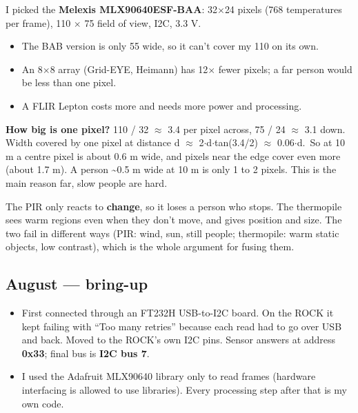 \documentclass[11pt,a4paper]{article}
\providecommand{\tightlist}{\setlength{\itemsep}{0pt}\setlength{\parskip}{0pt}}
\begin{document}
I picked the \textbf{Melexis
MLX90640ESF-BAA}: 32$\times$24 pixels
(768 temperatures per frame),
110\textdegree{} $\times$ 75\textdegree{} field of view, I2C,
3.3 V.

\begin{itemize}
\tightlist
\item
  The BAB version is only 55\textdegree{}
  wide, so it can't cover my
  110\textdegree{} on its own.
\item
  An 8$\times$8 array (Grid-EYE,
  Heimann) has 12$\times$ fewer
  pixels; a far person would
  be less than one pixel.
\item
  A FLIR Lepton costs more and
  needs more power and
  processing.
\end{itemize}

\textbf{How big is one pixel?}
110\textdegree{} / 32 $\approx$ 3.4\textdegree{} per pixel
across, 75\textdegree{} / 24 $\approx$ 3.1\textdegree{} down.
Width covered by one pixel at
distance d $\approx$ 2$\cdot$d$\cdot$tan(3.4\textdegree{}/2) $\approx$
0.06$\cdot$d.~So at 10 m a centre
pixel is about 0.6 m wide, and
pixels near the edge cover
even more (about 1.7 m). A
person \textasciitilde0.5 m
wide at 10 m is only 1 to 2
pixels. This is the main
reason far, slow people are
hard.

The PIR only reacts to
\textbf{change}, so it loses a
person who stops. The
thermopile sees warm regions
even when they don't move, and
gives position and size. The
two fail in different ways
(PIR: wind, sun, still people;
thermopile: warm static
objects, low contrast), which
is the whole argument for
fusing them.

\hypertarget{august-bring-up}{%
\subsection{August ---
bring-up}\label{august-bring-up}}

\begin{itemize}
\tightlist
\item
  First connected through an
  FT232H USB-to-I2C board. On
  the ROCK it kept failing
  with ``Too many retries''
  because each read had to go
  over USB and back. Moved to
  the ROCK's own I2C pins.
  Sensor answers at address
  \textbf{0x33}; final bus is
  \textbf{I2C bus 7}.
\item
  I used the Adafruit MLX90640
  library only to read frames
  (hardware interfacing is
  allowed to use libraries).
  Every processing step after
  that is my own code.
\end{itemize}
\end{document}
